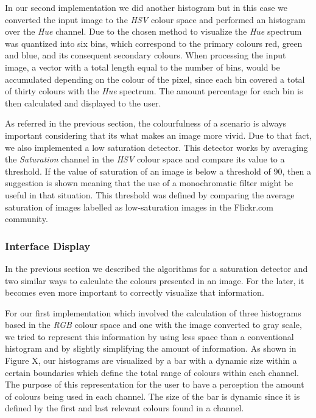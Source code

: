 In our second implementation we did another histogram but in this case we converted the input image to the \emph{HSV} colour space and performed an histogram over the \emph{Hue} channel. Due to the chosen method to visualize the \emph{Hue} spectrum was quantized into six bins, which correspond to the primary colours red, green and blue, and its consequent secondary colours.
When processing the input image, a vector with a total length equal to the number of bins, would be accumulated depending on the colour of the pixel, since each bin covered a total of thirty colours with the \emph{Hue} spectrum. The amount percentage for each bin is then calculated and displayed to the user.

As referred in the previous section, the colourfulness of a scenario is always important considering that its what makes an image more vivid. Due to that fact, we also implemented a low saturation detector. This detector works by averaging the \emph{Saturation} channel in the \emph{HSV} colour space and compare its value to a threshold. If the value of saturation of an image is below a threshold of 90, then a suggestion is shown meaning that the use of a monochromatic filter might be useful in that situation. This threshold was defined by comparing the average saturation of images labelled as low-saturation images in the Flickr.com community.

\subsubsection{Interface Display}
In the previous section we described the algorithms for a saturation detector and two similar ways to calculate the colours presented in an image. For the later, it becomes even more important to correctly visualize that information.

For our first implementation which involved the calculation of three histograms based in the \emph{RGB} colour space and one with the image converted to gray scale, we tried to represent this information by using less space than a conventional histogram and by slightly simplifying the amount of information. As shown in Figure X, our histograms are visualized by a bar with a dynamic size within a certain boundaries which define the total range of colours within each channel. The purpose of this representation for the user to have a perception the amount of colours being used in each channel. The size of the bar is dynamic since it is defined by the first and last relevant colours found in a channel.

